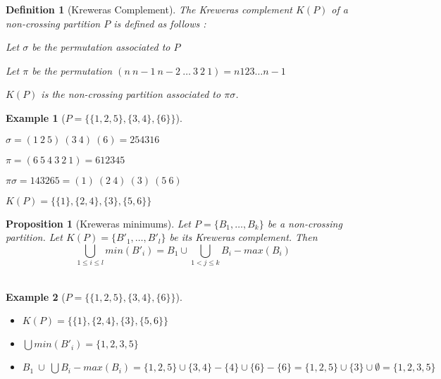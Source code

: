 \documentclass[12pt]{report}
\newtheorem*{prop}{Proposition}
\newtheorem{definition}{Definition}
\newtheorem*{example}{Example}
\begin{document}
\begin{definition}[Kreweras Complement]
    The \emph{Kreweras complement} $K (P)$ of a non-crossing
    partition $P$ is defined as follows :\\
    \begin{itemize*}
        \item Let $\sigma$ be the permutation associated to $P$\\
        \item Let $\pi$ be the permutation $(n\ n-1\ n-2\
        \ldots\ 3\ 2\ 1) = n123 \ldots n-1$\\
        \item $K (P)$ is the \emph{non-crossing partition}
        associated to $\pi \sigma$.\\
    \end{itemize*}
\end{definition}

\begin{example}[$P = \{\{1, 2, 5\}, \{3, 4\}, \{6\}\}$]
    ~\\
    \begin{itemize*}
        \item $\sigma = (1\ 2\ 5)\ (3\ 4)\ (6) = 254316$\\
        \item $\pi = (6\ 5\ 4\ 3\ 2\ 1) = 612345$\\
        \item $\pi \sigma = 143265 = (1)\ (2\ 4)\ (3)\ (5\ 6)$\\
        \item $K(P) = \{\{1\},\{2, 4\}, \{3\}, \{5, 6\}\}$\\
    \end{itemize*}
\end{example}

\begin{prop}[Kreweras minimums]
        Let $P = \{B_1, \ldots, B_k\}$ be a non-crossing partition.
        Let $K (P) = \{B'_1, \ldots, B'_l\}$ be its Kreweras complement.
        Then $$\bigcup_{1 \leq i \leq l}{min (B'_i)} =
        B_1 \cup \bigcup_{1 < j \leq k}{B_i - {max (B_i)}}$$\\
\end{prop}

\begin{example}[$P = \{\{1, 2, 5\}, \{3, 4\}, \{6\}\}$]
    ~\\
    \begin{itemize}
        \item $K (P) = \{\{1\},\{2, 4\}, \{3\}, \{5, 6\}\}$
        \item $\bigcup{min (B'_i)} = \{1, 2, 3, 5\}$
        \item $B_1\ \cup\ \bigcup{B_i - {max (B_i)}}
        = \{1, 2, 5\} \cup \{3, 4\} - \{4\} \cup \{6\} - \{6\}
        = \{1, 2, 5\} \cup \{3\} \cup \emptyset = \{1, 2, 3, 5\}$\\
    \end{itemize}
\end{example}
\end{document}
